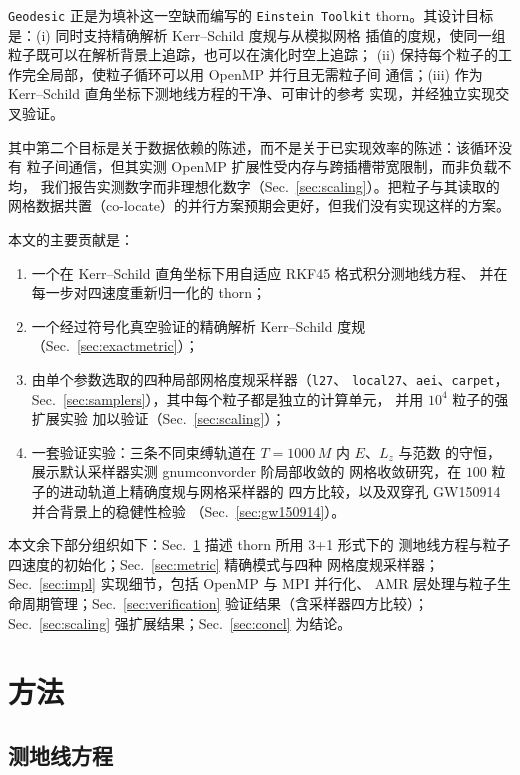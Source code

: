 \documentclass[11pt,UTF8]{ctexart}
\newcommand{\num}[1]{\csname gnum#1\endcsname}
\begin{document}
\texttt{Geodesic} 正是为填补这一空缺而编写的 \texttt{Einstein Toolkit}
thorn。其设计目标是：(i) 同时支持精确解析 Kerr--Schild 度规与从模拟网格
插值的度规，使同一组粒子既可以在解析背景上追踪，也可以在演化时空上追踪；
(ii) 保持每个粒子的工作完全局部，使粒子循环可以用 OpenMP 并行且无需粒子间
通信；(iii) 作为 Kerr--Schild 直角坐标下测地线方程的干净、可审计的参考
实现，并经独立实现交叉验证。

其中第二个目标是关于数据依赖的陈述，而不是关于已实现效率的陈述：该循环没有
粒子间通信，但其实测 OpenMP 扩展性受内存与跨插槽带宽限制，而非负载不均，
我们报告实测数字而非理想化数字（Sec.~\ref{sec:scaling}）。把粒子与其读取的
网格数据共置（co-locate）的并行方案预期会更好，但我们没有实现这样的方案。

本文的主要贡献是：
\begin{enumerate}
\item 一个在 Kerr--Schild 直角坐标下用自适应 RKF45 格式积分测地线方程、
  并在每一步对四速度重新归一化的 thorn；
\item 一个经过符号化真空验证的精确解析 Kerr--Schild 度规
  （Sec.~\ref{sec:exactmetric}）；
\item 由单个参数选取的四种局部网格度规采样器（\texttt{l27}、
  \texttt{local27}、\texttt{aei}、\texttt{carpet}，
  Sec.~\ref{sec:samplers}），其中每个粒子都是独立的计算单元，
  并用 $10^4$ 粒子的强扩展实验
  加以验证（Sec.~\ref{sec:scaling}）；
\item 一套验证实验：三条不同束缚轨道在 $T=1000\,M$ 内 $E$、$L_z$ 与范数
  的守恒，展示默认采样器实测 \num{convorder} 阶局部收敛的
  网格收敛研究，在 $100$ 粒子的进动轨道上精确度规与网格采样器的
  四方比较，以及双穿孔 GW150914 并合背景上的稳健性检验
  （Sec.~\ref{sec:gw150914}）。
\end{enumerate}

本文余下部分组织如下：Sec.~\ref{sec:method} 描述 thorn 所用 3+1 形式下的
测地线方程与粒子四速度的初始化；Sec.~\ref{sec:metric} 精确模式与四种
网格度规采样器；Sec.~\ref{sec:impl} 实现细节，包括 OpenMP 与 MPI 并行化、
AMR 层处理与粒子生命周期管理；Sec.~\ref{sec:verification} 验证结果（含采样器四方比较）；
Sec.~\ref{sec:scaling} 强扩展结果；Sec.~\ref{sec:concl} 为结论。

\section{方法}\label{sec:method}

\subsection{测地线方程}
\end{document}

